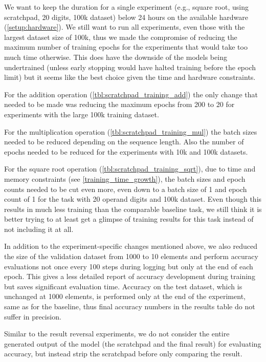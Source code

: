 We want to keep the duration for a single experiment (e.g., square root, using scratchpad, 20 digits, 100k dataset) below 24 hours on the available hardware (\cref{setup:hardware}).
We still want to run all experiments, even those with the largest dataset size of 100k, thus we made the compromise of reducing the maximum number of training epochs for the experiments that would take too much time otherwise. This does have the downside of the models being undertrained (unless early stopping would have halted training before the epoch limit) but it seems like the best choice given the time and hardware constraints.


For the addition operation (\cref{tbl:scratchpad_training_add}) the only change that needed to be made was reducing the maximum epochs from 200 to 20 for experiments with the large 100k training dataset.

For the multiplication operation (\cref{tbl:scratchpad_training_mul}) the batch sizes needed to be reduced depending on the sequence length. Also the number of epochs needed to be reduced for the experiments with 10k and 100k datasets.

For the square root operation (\cref{tbl:scratchpad_training_sqrt}), due to time and memory constraints (see \cref{training_time_growth}), the batch sizes and epoch counts needed to be cut even more, even down to a batch size of 1 and epoch count of 1 for the task with 20 operand digits and 100k dataset. Even though this results in much less training than the comparable baseline task, we still think it is better trying to at least get a glimpse of training results for this task instead of not including it at all.

In addition to the experiment-specific changes mentioned above, we also reduced the size of the validation dataset from 1000 to 10 elements and perform accuracy evaluations not once every 100 steps during logging but only at the end of each epoch. This gives a less detailed report of accuracy development during training but saves significant evaluation time. Accuracy on the test dataset, which is unchanged at 1000 elements, is performed only at the end of the experiment, same as for the baseline, thus final accuracy numbers in the results table do not suffer in precision.

Similar to the result reversal experiments,  we do not consider the entire generated output of the model (the scratchpad and the final result) for evaluating accuracy, but instead strip the scratchpad before only comparing the result.

